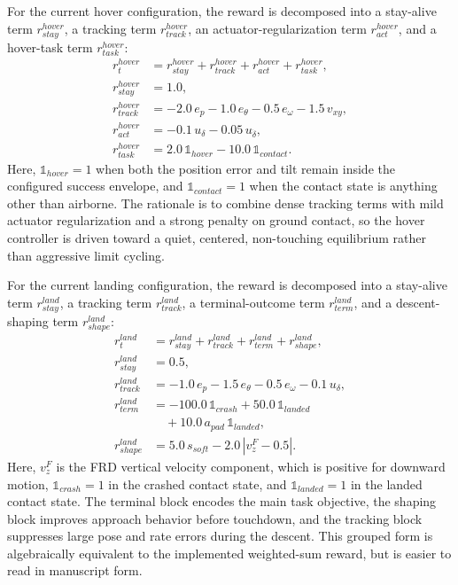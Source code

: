 \documentclass[10pt,twocolumn]{article}
\begin{document}
For the current hover configuration, the reward is decomposed into a stay-alive term $r_{stay}^{hover}$, a tracking term $r_{track}^{hover}$, an actuator-regularization term $r_{act}^{hover}$, and a hover-task term $r_{task}^{hover}$:
\begin{subequations}\label{eq:hover_reward_impl}
\begin{align}
r_t^{hover}
&= r_{stay}^{hover} + r_{track}^{hover}
 + r_{act}^{hover} + r_{task}^{hover}, \\
r_{stay}^{hover}
&= 1.0, \\
r_{track}^{hover}
&= -2.0\,e_p - 1.0\,e_\theta - 0.5\,e_\omega - 1.5\,v_{xy}, \\
r_{act}^{hover}
&= -0.1\,u_\delta - 0.05\,u_{\dot\delta}, \\
r_{task}^{hover}
&= 2.0\,\mathbb{1}_{hover} - 10.0\,\mathbb{1}_{contact}.
\end{align}
\end{subequations}
Here, $\mathbb{1}_{hover}=1$ when both the position error and tilt remain inside the configured success envelope, and $\mathbb{1}_{contact}=1$ when the contact state is anything other than airborne. The rationale is to combine dense tracking terms with mild actuator regularization and a strong penalty on ground contact, so the hover controller is driven toward a quiet, centered, non-touching equilibrium rather than aggressive limit cycling.

For the current landing configuration, the reward is decomposed into a stay-alive term $r_{stay}^{land}$, a tracking term $r_{track}^{land}$, a terminal-outcome term $r_{term}^{land}$, and a descent-shaping term $r_{shape}^{land}$:
\begin{subequations}\label{eq:landing_reward_impl}
\begin{align}
r_t^{land}
&= r_{stay}^{land} + r_{track}^{land}
 + r_{term}^{land} + r_{shape}^{land}, \\
r_{stay}^{land}
&= 0.5, \\
r_{track}^{land}
&= -1.0\,e_p - 1.5\,e_\theta - 0.5\,e_\omega - 0.1\,u_\delta, \\
r_{term}^{land}
&= -100.0\,\mathbb{1}_{crash} + 50.0\,\mathbb{1}_{landed} \nonumber\\
&\quad + 10.0\,a_{pad}\,\mathbb{1}_{landed}, \\
r_{shape}^{land}
&= 5.0\,s_{soft} - 2.0\,|v_z^{F} - 0.5|.
\end{align}
\end{subequations}
Here, $v_z^{F}$ is the FRD vertical velocity component, which is positive for downward motion, $\mathbb{1}_{crash}=1$ in the crashed contact state, and $\mathbb{1}_{landed}=1$ in the landed contact state. The terminal block encodes the main task objective, the shaping block improves approach behavior before touchdown, and the tracking block suppresses large pose and rate errors during the descent. This grouped form is algebraically equivalent to the implemented weighted-sum reward, but is easier to read in manuscript form.
\end{document}
